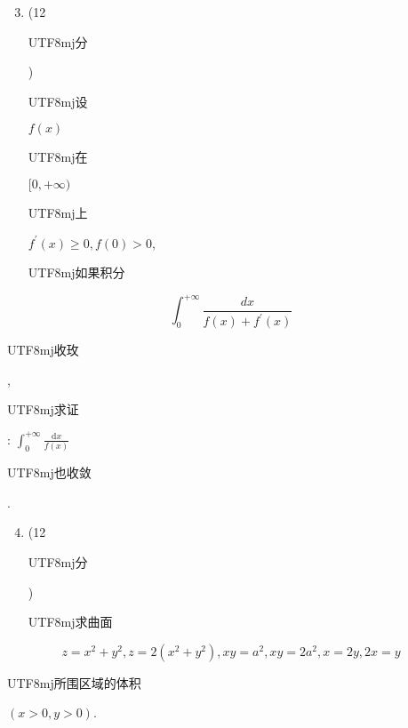 \documentclass[10pt]{article}
\begin{document}
\begin{enumerate}
  \setcounter{enumi}{2}
  \item (12 \begin{CJK}{UTF8}{mj}分\end{CJK}) \begin{CJK}{UTF8}{mj}设\end{CJK} $f(x)$ \begin{CJK}{UTF8}{mj}在\end{CJK} $[0,+\infty)$ \begin{CJK}{UTF8}{mj}上\end{CJK} $f^{\prime}(x) \geqslant 0, f(0)>0$, \begin{CJK}{UTF8}{mj}如果积分\end{CJK}
\end{enumerate}
$$
\int_{0}^{+\infty} \frac{d x}{f(x)+f^{\prime}(x)}
$$
\begin{CJK}{UTF8}{mj}收玫\end{CJK}, \begin{CJK}{UTF8}{mj}求证\end{CJK}: $\int_{0}^{+\infty} \frac{\mathrm{d} x}{f(x)}$ \begin{CJK}{UTF8}{mj}也收敛\end{CJK}.

\begin{enumerate}
  \setcounter{enumi}{3}
  \item (12 \begin{CJK}{UTF8}{mj}分\end{CJK}) \begin{CJK}{UTF8}{mj}求曲面\end{CJK}
\end{enumerate}
$$
z=x^{2}+y^{2}, z=2\left(x^{2}+y^{2}\right), x y=a^{2}, x y=2 a^{2}, x=2 y, 2 x=y
$$
\begin{CJK}{UTF8}{mj}所围区域的体积\end{CJK} $(x>0, y>0)$.
\end{document}
